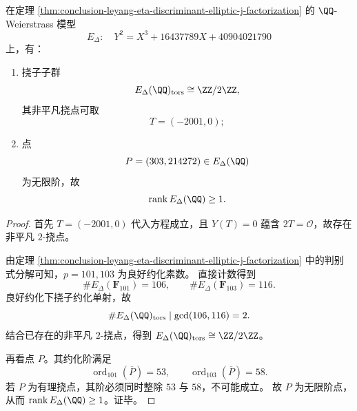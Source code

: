 \begin{proposition}\label{prop:conclusion-leyang-eta-edelta-mw-torsion-rank}
在定理
\ref{thm:conclusion-leyang-eta-discriminant-elliptic-j-factorization}
的 \(\QQ\)-Weierstrass 模型
\[
E_\Delta:\quad Y^2=X^3+16437789X+40904021790
\]
上，有：
\begin{enumerate}
  \item 挠子子群
  \[
  E_\Delta(\QQ)_{\mathrm{tors}}\cong \ZZ/2\ZZ,
  \]
  其非平凡挠点可取
  \[
  T=(-2001,0);
  \]
  \item 点
  \[
  P=(303,214272)\in E_\Delta(\QQ)
  \]
  为无限阶，故
  \[
  \operatorname{rank}E_\Delta(\QQ)\ge 1.
  \]
\end{enumerate}
\end{proposition}
\begin{proof}
首先 \(T=(-2001,0)\) 代入方程成立，且 \(Y(T)=0\) 蕴含 \(2T=\mathcal O\)，故存在非平凡 \(2\)-挠点。

由定理
\ref{thm:conclusion-leyang-eta-discriminant-elliptic-j-factorization}
中的判别式分解可知，\(p=101,103\) 为良好约化素数。
直接计数得到
\[
\#E_\Delta(\mathbf F_{101})=106,\qquad
\#E_\Delta(\mathbf F_{103})=116.
\]
良好约化下挠子约化单射，故
\[
\#E_\Delta(\QQ)_{\mathrm{tors}}
\mid \gcd(106,116)=2.
\]
结合已存在的非平凡 \(2\)-挠点，得到
\(
E_\Delta(\QQ)_{\mathrm{tors}}\cong\ZZ/2\ZZ
\)。

再看点 \(P\)。其约化阶满足
\[
\operatorname{ord}_{101}(\overline P)=53,\qquad
\operatorname{ord}_{103}(\overline P)=58.
\]
若 \(P\) 为有理挠点，其阶必须同时整除 \(53\) 与 \(58\)，不可能成立。
故 \(P\) 为无限阶点，从而 \(\operatorname{rank}E_\Delta(\QQ)\ge1\)。证毕。
\end{proof}
